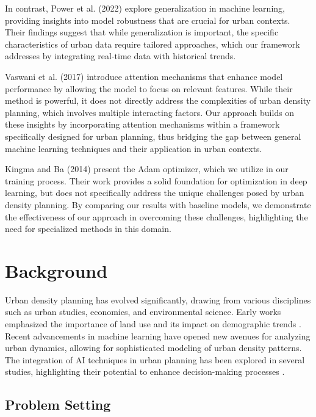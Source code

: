 \documentclass{article} %
\begin{document}

In contrast, Power et al. (2022) explore generalization in machine learning, providing insights into model robustness that are crucial for urban contexts. Their findings suggest that while generalization is important, the specific characteristics of urban data require tailored approaches, which our framework addresses by integrating real-time data with historical trends.

Vaswani et al. (2017) introduce attention mechanisms that enhance model performance by allowing the model to focus on relevant features. While their method is powerful, it does not directly address the complexities of urban density planning, which involves multiple interacting factors. Our approach builds on these insights by incorporating attention mechanisms within a framework specifically designed for urban planning, thus bridging the gap between general machine learning techniques and their application in urban contexts.

Kingma and Ba (2014) present the Adam optimizer, which we utilize in our training process. Their work provides a solid foundation for optimization in deep learning, but does not specifically address the unique challenges posed by urban density planning. By comparing our results with baseline models, we demonstrate the effectiveness of our approach in overcoming these challenges, highlighting the need for specialized methods in this domain.

\section{Background}
\label{sec:background}

Urban density planning has evolved significantly, drawing from various disciplines such as urban studies, economics, and environmental science. Early works emphasized the importance of land use and its impact on demographic trends \citep{goodfellow2016deep}. Recent advancements in machine learning have opened new avenues for analyzing urban dynamics, allowing for sophisticated modeling of urban density patterns. The integration of AI techniques in urban planning has been explored in several studies, highlighting their potential to enhance decision-making processes \citep{kingma2014adam}.

\subsection{Problem Setting}
\label{subsec:problem_setting}
\end{document}
